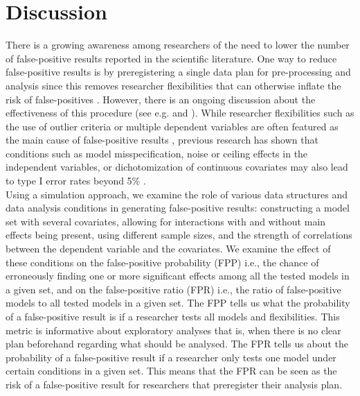 \section{Discussion}
There is a growing awareness among researchers of the need to lower the number of false-positive results reported in the scientific literature. One way to reduce false-positive results is by preregistering a single data plan for pre-processing and analysis since this removes researcher flexibilities that can otherwise inflate the risk of false-positives \citep{simmons2018}. However, there is an ongoing discussion about the effectiveness of this procedure (see e.g. \cite{Pham2020} and \cite{Simmons2020}). While researcher flexibilities such as the use of outlier criteria or multiple dependent variables are often featured as the main cause of false-positive results \citep{John2012}, previous research has shown that conditions such as model misspecification, noise or ceiling effects in the independent variables, or dichotomization of continuous covariates may also lead to type I error rates beyond 5\% \citep{Dennis2019, Brunner2009, Austin2003, Austin2004,Litiere07}. \\

Using a simulation approach, we examine the role of various data structures and data analysis conditions in generating false-positive results: constructing a model set with several covariates, allowing for interactions with and without main effects being present, using different sample sizes, and the strength of correlations between the dependent variable and the covariates. We examine the effect of these conditions on the false-positive probability (FPP) i.e., the chance of erroneously finding one or more significant effects among all the tested models in a given set, and on the false-positive ratio (FPR) i.e., the ratio of false-positive models to all tested models in a given set. The FPP tells us what the probability of a false-positive result is if a researcher tests all models and flexibilities. This metric is informative about exploratory analyses that is, when there is no clear plan beforehand regarding what should be analysed. The FPR tells us about the probability of a false-positive result if a researcher only tests one model under certain conditions in a given set. This means that the FPR can be seen as the risk of a false-positive result for researchers that preregister their analysis plan. \\

